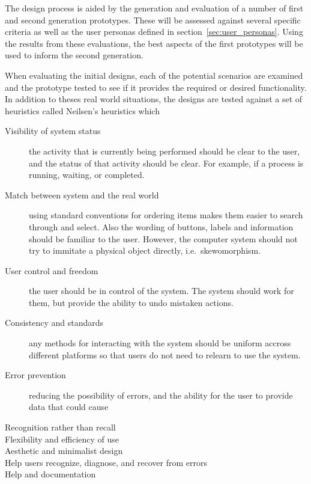 The design process is aided by the generation and evaluation of a number
of first and second generation prototypes. These will be assessed against
several specific criteria as well as the user personas defined in
section~\ref{sec:user_personas}. Using the results from these evaluations, the
best aspects of the first prototypes will be used to inform the second
generation.

When evaluating the initial designs, each of the potential scenarios are
examined and the prototype tested to see if it provides the required or desired
functionality. In addition to theses real world situations, the designs are tested
against a set of heuristics called Neilsen’s heuristics which

\begin{description}

	\item[Visibility of system status] the activity that is currently being
	performed should be clear to the user, and the status of that activity
	should be clear. For example, if a process is running, waiting, or
	completed.

	\item[Match between system and the real world] using standard conventions
	for ordering items makes them easier to search through and select. Also the
	wording of buttons, labels and information should be familiar to the
	user. However, the computer system should not try to immitate a physical
	object directly, i.e.\ skewomorphism.

	\item[User control and freedom] the user should be in control of the
	system. The system should work for them, but provide the ability to undo
	mistaken actions.

	\item[Consistency and standards] any methods for interacting with the
	system should be uniform accross different platforms so that users do not
	need to relearn to use the system.

	\item[Error prevention] reducing the possibility of errors, and the ability
	for the user to provide data that could cause 
	\item[Recognition rather than recall]
	\item[Flexibility and efficiency of use]
	\item[Aesthetic and minimalist design]
	\item[Help users recognize, diagnose, and recover from errors]
	\item[Help and documentation]
\end{description}
